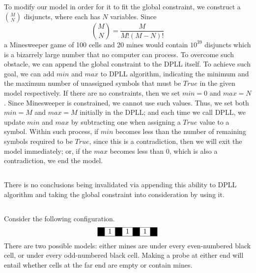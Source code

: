 \documentclass{article}
\begin{document}
    \subsection{}
    To modify our model in order for it to fit the global constraint, we construct a $\binom{M}{N}$ disjuncts, where each has $N$ variables. Since
    $$
        \binom{M}{N} = \frac{M}{M! (M-N)!}
    $$ 
    a Minesweeper game of 100 cells and 20 mines would contain $10^{39}$ disjuncts which is a bizarrely large number that no computer can process. To overcome such obstacle, we can append the global constraint to the DPLL itself. To achieve such goal, we can add $min$ and $max$ to DPLL algorithm, indicating the minimum and the maximum number of unassigned symbols that must be $True$ in the given model respectively. If there are no constraints, then we set $min = 0$ and $max = N$. Since Minesweeper is constrained, we cannot use such values. Thus, we set both $min = M$ and $max = M$ initially in the DPLL; and each time we call DPLL, we update $min$ and $max$ by subtracting one when assigning a $True$ value to a symbol. Within such process, if $min$ becomes less than the number of remaining symbols required to be $True$, since this is a contradiction, then we will exit the model immediately; or, if the $max$ becomes less than $0$, which is also a contradiction, we end the model. 
    \newpage
    \subsection{}
    There is no conclusions being invalidated via appending this ability to DPLL algorithm and taking the global constraint into consideration by using it.
    \subsection{}
    Consider the following configuration. 
    $$
    \begin{array}{|c|c|c|c|c|c|c|}
            \hline
            \cellcolor{black}{}&1&\cellcolor{black}{}&1&\cellcolor{black}{}&1&\cellcolor{black}{} \\\hline
        \end{array}
    $$
    There  are  two  possible  models: either mines are under every even-numbered black cell, or under every odd-numbered black cell. Making a probe at either end will entail whether cells at the far end are empty or contain mines.
    \section{}
\end{document}
